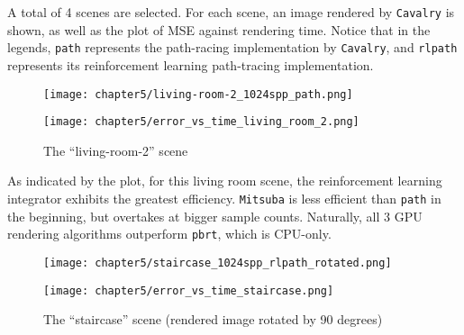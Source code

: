 A total of 4 scenes are selected. For each scene, an image rendered by \texttt{Cavalry} is shown, as well as the plot of MSE against rendering time. Notice that in the legends, \texttt{path} represents the path-racing implementation by \texttt{Cavalry}, and \texttt{rlpath} represents its reinforcement learning path-tracing implementation.

\begin{figure}[H]
    \centering
    
    \begin{minipage}[t]{.99\textwidth}
        \centering
        \vspace{0pt}
        \texttt{[image: chapter5/living-room-2\_1024spp\_path.png]}
    \end{minipage}
    
    \vspace{0.1cm}

    \begin{minipage}[t]{.99\textwidth}
        \centering
        \vspace{0pt}
        \texttt{[image: chapter5/error\_vs\_time\_living\_room\_2.png]}
    \end{minipage}
    
    \caption{The ``living-room-2'' scene}
\end{figure}

As indicated by the plot, for this living room scene, the reinforcement learning integrator exhibits the greatest efficiency. \texttt{Mitsuba} is less efficient than \texttt{path} in the beginning, but overtakes at bigger sample counts. Naturally, all 3 GPU rendering algorithms outperform \texttt{pbrt}, which is CPU-only.

\newpage

\begin{figure}[H]
    \centering
    
    \begin{minipage}[t]{.99\textwidth}
        \centering
        \vspace{0pt}
        \texttt{[image: chapter5/staircase\_1024spp\_rlpath\_rotated.png]}
    \end{minipage}
    
    \vspace{0.3cm}

    \begin{minipage}[t]{.99\textwidth}
        \centering
        \vspace{0pt}
        \texttt{[image: chapter5/error\_vs\_time\_staircase.png]}
    \end{minipage}
    
    \caption{The ``staircase'' scene (rendered image rotated by 90 degrees)}
\end{figure}

